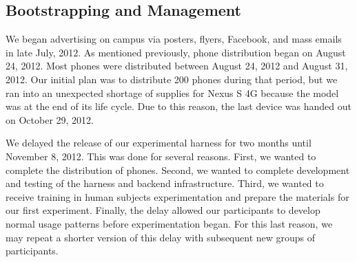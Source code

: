 \subsection{Bootstrapping and Management}

We began advertising \PhoneLab{} on campus via posters, flyers, Facebook, and
mass emails in late July, 2012. As mentioned previously, \PhoneLab{} phone
distribution began on August 24, 2012. Most phones were distributed between
August 24, 2012 and August 31, 2012. Our initial plan was to distribute 200
phones during that period, but we ran into an unexpected shortage of
supplies for Nexus S 4G because the model was at the end of its life cycle. Due
to this reason, the last device was handed out on October 29, 2012.

We delayed the release of our experimental harness for two months until
November 8, 2012. This was done for several reasons. First, we wanted to
complete the distribution of phones. Second, we wanted to complete development
and testing of the harness and backend infrastructure. Third, we wanted to
receive training in human subjects experimentation and prepare the materials for
our first experiment. Finally, the delay allowed our participants to develop
normal usage patterns before experimentation began. For this last reason, we may
repeat a shorter version of this delay with subsequent new groups of \PhoneLab{}
participants.
